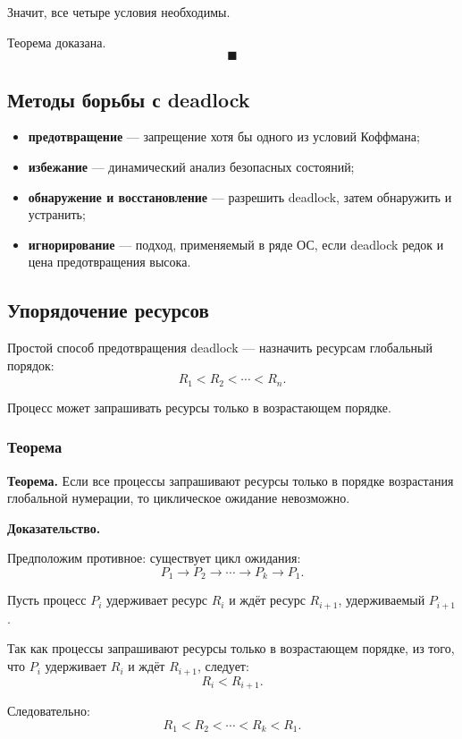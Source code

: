 \documentclass[12pt,a4paper]{article}
\begin{document}
Значит, все четыре условия необходимы.

Теорема доказана.
\[
\blacksquare
\]

\subsection{Методы борьбы с deadlock}

\begin{itemize}
    \item \textbf{предотвращение} --- запрещение хотя бы одного из условий Коффмана;
    \item \textbf{избежание} --- динамический анализ безопасных состояний;
    \item \textbf{обнаружение и восстановление} --- разрешить deadlock, затем обнаружить и устранить;
    \item \textbf{игнорирование} --- подход, применяемый в ряде ОС, если deadlock редок и цена предотвращения высока.
\end{itemize}

\subsection{Упорядочение ресурсов}

Простой способ предотвращения deadlock --- назначить ресурсам глобальный порядок:
\[
R_1 < R_2 < \cdots < R_n.
\]

Процесс может запрашивать ресурсы только в возрастающем порядке.

\subsubsection{Теорема}

\textbf{Теорема.}
Если все процессы запрашивают ресурсы только в порядке возрастания глобальной нумерации, то циклическое ожидание невозможно.

\textbf{Доказательство.}

Предположим противное: существует цикл ожидания:
\[
P_1 \rightarrow P_2 \rightarrow \cdots \rightarrow P_k \rightarrow P_1.
\]

Пусть процесс $P_i$ удерживает ресурс $R_i$ и ждёт ресурс $R_{i+1}$, удерживаемый $P_{i+1}$.

Так как процессы запрашивают ресурсы только в возрастающем порядке, из того, что $P_i$ удерживает $R_i$ и ждёт $R_{i+1}$, следует:
\[
R_i < R_{i+1}.
\]

Следовательно:
\[
R_1 < R_2 < \cdots < R_k < R_1.
\]
\end{document}
